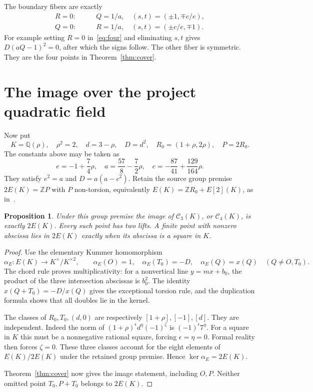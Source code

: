 \documentclass[11pt,a4paper]{article}
\newtheorem{proposition}[theorem]{Proposition}
\newcommand{\Q}{\mathbb Q}\newcommand{\Z}{\mathbb Z}
\begin{document}
The boundary fibers are exactly
\begin{align*}
 R=0:&\qquad Q=1/a,\quad (s,t)=(\pm1,\mp c/e),\\
 Q=0:&\qquad R=1/a,\quad (s,t)=(\pm c/e,\mp1).
\end{align*}
For example setting $R=0$ in~\eqref{eq:four} and eliminating $s,t$
gives $D(aQ-1)^2=0$, after which the signs follow. The other fiber
is symmetric. They are the four points in Theorem~\ref{thm:cover}.

\section{The image over the project quadratic field}
Now put
\[
 K=\Q(\rho),\quad\rho^2=2,\quad d=3-\rho,\quad D=d^2,
 \quad R_0=(1+\rho,2\rho),\quad P=2R_0.
\]
The constants above may be taken as
\[
 e=-1+\frac74\rho,\quad
 a=\frac{57}{8}-\frac72\rho,\quad
 c=-\frac{87}{41}+\frac{129}{164}\rho.
\]
They satisfy $e^2=a$ and $D=a(a-c^2)$. Retain the source group
premise $2E(K)=\Z P$ with $P$ non-torsion, equivalently
$E(K)=\Z R_0+E[2](K)$, as in~\cite{Quartic}.

\begin{proposition}\label{prop:image}
Under this group premise the image of $\mathcal C_3(K)$, or
$\mathcal C_4(K)$, is exactly $2E(K)$. Every such point has two
lifts. A finite point with nonzero abscissa lies in $2E(K)$ exactly
when its abscissa is a square in $K$.
\end{proposition}
\begin{proof}
Use the elementary Kummer homomorphism
\[
 \alpha_E:E(K)\longrightarrow K^\times/K^{\times2},\qquad
 \alpha_E(O)=1,\quad\alpha_E(T_0)=-D,
 \quad\alpha_E(Q)=x(Q)\quad(Q\ne O,T_0).
\]
The chord rule proves multiplicativity: for a nonvertical line
$y=mx+b_0$, the product of the three intersection abscissas is
$b_0^2$. The identity
$x(Q+T_0)=-D/x(Q)$ gives the exceptional torsion rule, and the
duplication formula shows that all doubles lie in the kernel.

The classes of $R_0,T_0,(d,0)$ are respectively
$[1+\rho],[-1],[d]$. They are independent. Indeed the norm of
$(1+\rho)^\epsilon d^\eta(-1)^\zeta$ is
$(-1)^\epsilon7^\eta$. For a square in $K$ this must be a
nonnegative rational square, forcing $\epsilon=\eta=0$.
Formal reality then forces $\zeta=0$. These three classes account
for the eight elements of $E(K)/2E(K)$ under the retained group
premise. Hence $\ker\alpha_E=2E(K)$.

Theorem~\ref{thm:cover} now gives the image statement, including
$O,P$. Neither omitted point $T_0,P+T_0$ belongs to $2E(K)$.
\end{proof}
\end{document}

